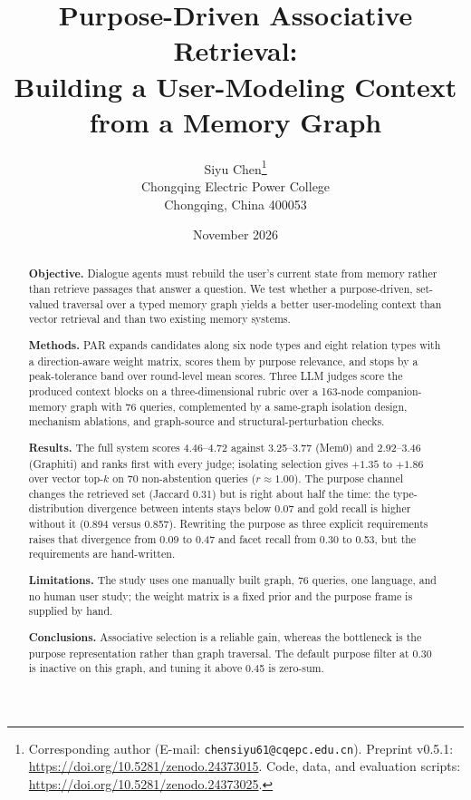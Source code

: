 \documentclass[11pt]{article}
\title{Purpose-Driven Associative Retrieval:\\
Building a User-Modeling Context from a Memory Graph}
\author{Siyu Chen\thanks{Corresponding author (E-mail: \texttt{chensiyu61@cqepc.edu.cn}).
  Preprint v0.5.1: \url{https://doi.org/10.5281/zenodo.24373015}. Code, data, and evaluation
  scripts: \url{https://doi.org/10.5281/zenodo.24373025}.} \\
  Chongqing Electric Power College \\
  Chongqing, China 400053}
\date{November 2026}
\newif\ifchinaxiv
\begin{document}
\maketitle

\ifchinaxiv
\begin{abstract}
\noindent\textbf{Objective.} Dialogue agents must rebuild the user's current state from memory
rather than retrieve passages that answer a question. We test whether a purpose-driven,
set-valued traversal over a typed memory graph yields a better user-modeling context than
vector retrieval and than two existing memory systems.

\par\smallskip
\noindent\textbf{Methods.} PAR expands candidates along six node types and eight relation types
with a direction-aware weight matrix, scores them by purpose relevance, and stops by a
peak-tolerance band over round-level mean scores. Three LLM judges score the produced context
blocks on a three-dimensional rubric over a 163-node companion-memory graph with 76 queries,
complemented by a same-graph isolation design, mechanism ablations, and graph-source and
structural-perturbation checks.

\par\smallskip
\noindent\textbf{Results.} The full system scores 4.46--4.72 against 3.25--3.77 (Mem0) and
2.92--3.46 (Graphiti) and ranks first with every judge; isolating selection gives $+1.35$ to
$+1.86$ over vector top-$k$ on 70 non-abstention queries ($r\approx1.00$). The purpose channel
changes the retrieved set (Jaccard 0.31) but is right about half the time: the type-distribution
divergence between intents stays below 0.07 and gold recall is higher without it (0.894 versus
0.857). Rewriting the purpose as three explicit requirements raises that divergence from 0.09 to
0.47 and facet recall from 0.30 to 0.53, but the requirements are hand-written.

\par\smallskip
\noindent\textbf{Limitations.} The study uses one manually built graph, 76 queries, one language,
and no human user study; the weight matrix is a fixed prior and the purpose frame is supplied by
hand.

\par\smallskip
\noindent\textbf{Conclusions.} Associative selection is a reliable gain, whereas the bottleneck
is the purpose representation rather than graph traversal. The default purpose filter at 0.30 is
inactive on this graph, and tuning it above 0.45 is zero-sum.
\end{abstract}
\end{document}
